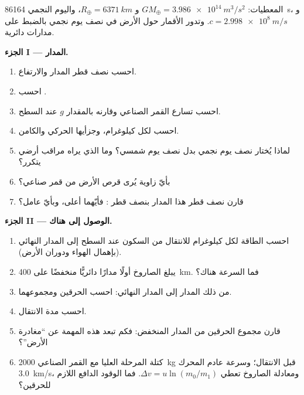 \begin{problem}
\label{pb:b1:central-forces:1}
المعطيات: $GM_\oplus = \qty{3.986e14}{m^3/s^2}$ و $R_\oplus = \qty{6371}{km}$،
واليوم النجمي \qty{86164}{s}، و $c = \qty{2.998e8}{m/s}$. وتدور الأقمار
حول الأرض في نصف يوم نجمي بالضبط على مدارات دائرية.

\medskip
\noindent\textbf{الجزء I --- المدار.}
\begin{enumerate}
  \item احسب نصف قطر المدار والارتفاع.
  \item احسب .
  \item احسب تسارع القمر الصناعي وقارنه بالمقدار $g$ عند
        السطح.
  \item احسب  لكل كيلوغرام، وجزأيها الحركي
        والكامن.
  \item لماذا يُختار نصف يوم نجمي بدل نصف يوم شمسي؟
        وما الذي يراه مراقب أرضي يتكرر؟
  \item بأيّ زاوية يُرى قرص الأرض من قمر صناعي؟
  \item قارن نصف قطر هذا المدار بنصف قطر :
        فأيّهما أعلى، وبأيّ عامل؟
\end{enumerate}

\medskip
\noindent\textbf{الجزء II --- الوصول إلى هناك.}
\begin{enumerate}[resume]
  \item احسب الطاقة لكل كيلوغرام للانتقال من السكون عند السطح إلى المدار
        النهائي (بإهمال الهواء ودوران الأرض).
  \item يبلغ الصاروخ أولًا مدارًا دائريًّا منخفضًا على \qty{400}{km}.
        فما السرعة هناك؟
  \item {} من ذلك المدار إلى المدار النهائي: احسب الحرقين
        ومجموعهما.
  \item احسب مدة الانتقال.
  \item قارن مجموع الحرقين  من المدار
        المنخفض: فكم تبعد هذه المهمة عن ``مغادرة الأرض''؟
  \item كتلة المرحلة العليا مع القمر الصناعي \qty{2000}{kg} قبل
        الانتقال؛ وسرعة عادم المحرك \qty{3.0}{km/s}، ومعادلة
        الصاروخ تعطي $\Delta v = u\ln(m_0/m_1)$. فما الوقود الدافع
        اللازم للحرقين؟
\end{enumerate}


\end{problem}
